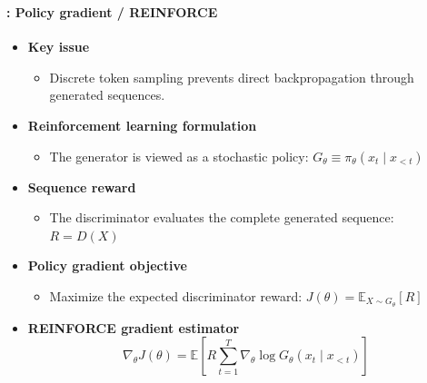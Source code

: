 \documentclass[xcolor=table]{beamer}
\begin{document}
	\begin{frame}
		\frametitle{\insertshortsubtitle}
		\framesubtitle{\insertsection: Policy gradient / REINFORCE}
		
		\begin{itemize}
			
			\item \textbf{Key issue}
			\begin{itemize}
				\item Discrete token sampling prevents direct backpropagation through generated sequences.
			\end{itemize}
			
			\item \textbf{Reinforcement learning formulation}
			\begin{itemize}
				\item The generator is viewed as a stochastic policy:
				$G_\theta \equiv \pi_\theta(x_t \mid x_{<t})$
			\end{itemize}
			
			\item \textbf{Sequence reward}
			\begin{itemize}
				\item The discriminator evaluates the complete generated sequence:
				$R = D(X)$
			\end{itemize}
			
			\item \textbf{Policy gradient objective}
			\begin{itemize}
				\item Maximize the expected discriminator reward:
				$J(\theta) =	\mathbb{E}_{X \sim G_\theta}[R]$
			\end{itemize}
			
			\item \textbf{REINFORCE gradient estimator}
			\[
			\nabla_\theta J(\theta)
			=
			\mathbb{E}
			\left[
			R
			\sum_{t=1}^{T}
			\nabla_\theta
			\log G_\theta(x_t \mid x_{<t})
			\right]
			\]
			
		\end{itemize}
		
	\end{frame}
	
\end{document}

